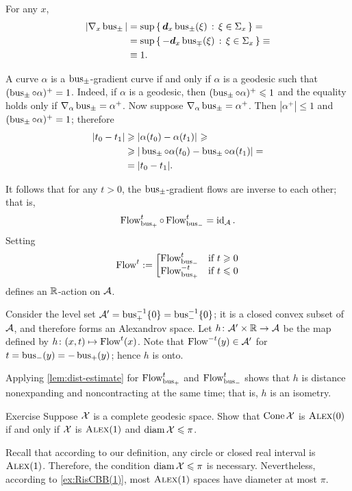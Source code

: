 For any $x$,
\begin{align*}
|\nabla_x \bus_\pm|
&=\sup\set{\dd_x\bus_\pm(\xi)}{\xi\in\Sigma_x}=\\
&=\sup\set{-\dd_x\bus_\mp(\xi)}{\xi\in\Sigma_x}\equiv\\
&\equiv1.
\end{align*}

A curve $\alpha$ is a $\operatorname{\rm bus}\nolimits_\pm$-gradient curve
if and only if $\alpha$ is a geodesic such that $(\operatorname{\rm bus}\nolimits_\pm\circ\alpha)^+=1$.
Indeed, if $\alpha$ is a geodesic, then $(\operatorname{\rm bus}\nolimits_\pm\circ\alpha)^+\leqslant 1$ and the equality holds only if $\nabla_\alpha\operatorname{\rm bus}\nolimits_\pm=\alpha^+$.
Now suppose $\nabla_\alpha\bus_\pm\z=\alpha^+$.
Then $|\alpha^+|\le 1$ and $(\operatorname{\rm bus}\nolimits_\pm\circ\alpha)^+=1$; therefore 
\begin{align*}
|t_0-t_1|&\ge \dist{\alpha(t_0)}{\alpha(t_1)}{}\ge
\\
&\ge|\bus_\pm\circ\alpha(t_0)-\bus_\pm\circ\alpha(t_1)|=
\\
&=|t_0-t_1|.
\end{align*}

It follows that for any $t>0$, the $\operatorname{\rm bus}\nolimits_\pm$-gradient flows are inverse to each other;
that is, 
\[\mathop{\rm Flow}\nolimits_{\operatorname{\rm bus}\nolimits_+}^t\circ\mathop{\rm Flow}\nolimits_{\operatorname{\rm bus}\nolimits_-}^t=\operatorname{\rm id}\nolimits_{\mathcal{A}}.\]
Setting
\[\mathop{\rm Flow}\nolimits^t\mathrel{:=}
\left[
\begin{matrix}
\mathop{\rm Flow}\nolimits_{\operatorname{\rm bus}\nolimits_-}^{t}&\hbox{if}\ t\geqslant0
\\
\mathop{\rm Flow}\nolimits_{\operatorname{\rm bus}\nolimits_+}^{-t}&\hbox{if}\ t\leqslant0
\end{matrix}
\right.\]
defines an $\mathbb{R}$-action on $\mathcal{A}$.

Consider the level set $\mathcal{A}'=\operatorname{\rm bus}\nolimits_+^{-1}\{0\}=\operatorname{\rm bus}\nolimits_-^{-1}\{0\}$;
it is a closed convex subset of $\mathcal{A}$, and therefore forms an Alexandrov space.
Let $h\colon\mathcal{A}'\times \mathbb{R}\to \mathcal{A}$ be the map defined by $h\colon(x,t)\mapsto \mathop{\rm Flow}\nolimits^t(x)$.
Note that $\mathop{\rm Flow}\nolimits^{-t}(y)\in \mathcal{A}'$ for $t=\operatorname{\rm bus}\nolimits_-(y)=-\operatorname{\rm bus}\nolimits_+(y)$; hence $h$ is onto.

Applying \ref{lem:dist-estimate} for $\mathop{\rm Flow}\nolimits_{\operatorname{\rm bus}\nolimits_+}^t$ and $\mathop{\rm Flow}\nolimits_{\operatorname{\rm bus}\nolimits_-}^t$ shows that $h$ is distance nonexpanding and noncontracting at the same time; that is, $h$ is an isometry.
\qeds

\begin{thm}{Exercise}\label{ex:cone-CBB}
Suppose $\mathcal{X}$ is a complete geodesic space.
Show that $\mathop{\rm Cone}\nolimits\mathcal{X}$ is $\textup{\textsc{Alex}}(0)$ if and only if $\mathcal{X}$ is $\textup{\textsc{Alex}}(1)$ and $\operatorname{\rm diam}\nolimits\mathcal{X}\leqslant \pi$.
\end{thm}

Recall that according to our definition, any circle or closed real interval is $\textup{\textsc{Alex}}(1)$.
Therefore, the condition $\operatorname{\rm diam}\nolimits\mathcal{X}\leqslant \pi$ is necessary.
Nevertheless, according to \ref{ex:RisCBB(1)}, most $\textup{\textsc{Alex}}(1)$ spaces have diameter at most $\pi$.

